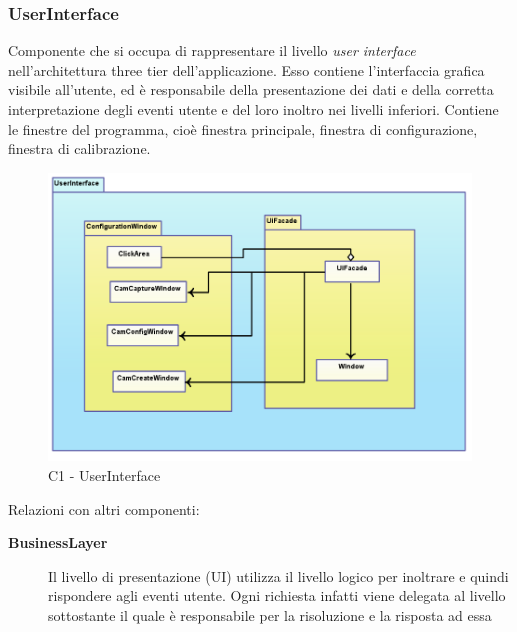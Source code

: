 \subsubsection{UserInterface} \label{sec:c1}
Componente che si occupa di rappresentare il livello \textit{user interface} nell'architettura three tier dell'applicazione. Esso contiene l'interfaccia grafica visibile all'utente, ed è responsabile della presentazione dei dati e della corretta interpretazione degli eventi utente e del loro inoltro nei livelli inferiori. Contiene le finestre del programma, cioè finestra principale, finestra di configurazione, finestra di calibrazione. \\
\begin{figure}[!h] 

        \centering 

        \includegraphics[scale=0.4]{./images/c1.png} 

        \caption{C1 - UserInterface} 

        \label{fig:c1}

        \end{figure} 

Relazioni con altri componenti: 
\begin{description} 
\item [\textbf{BusinessLayer}]
Il livello di presentazione (UI) utilizza il livello logico per inoltrare e quindi rispondere agli eventi utente. Ogni richiesta infatti viene delegata al livello sottostante il quale è responsabile per la risoluzione e la risposta ad essa 
\end{description} 

